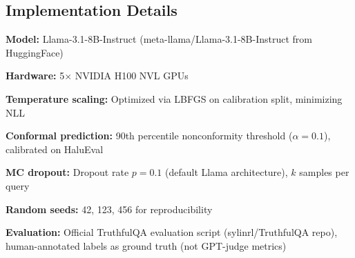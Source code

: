 \subsection{Implementation Details}

\textbf{Model:} Llama-3.1-8B-Instruct (meta-llama/Llama-3.1-8B-Instruct from HuggingFace)

\textbf{Hardware:} 5$\times$ NVIDIA H100 NVL GPUs

\textbf{Temperature scaling:} Optimized via LBFGS on calibration split, minimizing NLL

\textbf{Conformal prediction:} 90th percentile nonconformity threshold ($\alpha = 0.1$), calibrated on HaluEval

\textbf{MC dropout:} Dropout rate $p=0.1$ (default Llama architecture), $k$ samples per query

\textbf{Random seeds:} 42, 123, 456 for reproducibility

\textbf{Evaluation:} Official TruthfulQA evaluation script (sylinrl/TruthfulQA repo), human-annotated labels as ground truth (not GPT-judge metrics)
